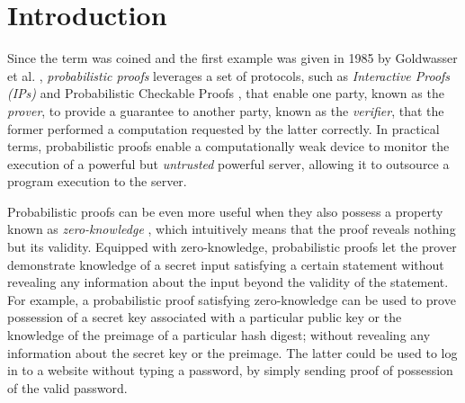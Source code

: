\section{Introduction}

Since the term was coined and the first example was given in 1985 by Goldwasser et al. \cite{STOC:GolMicRac85}, \textit{probabilistic proofs} leverages a set of protocols, such as \textit{Interactive Proofs (IPs)} \cite{STOC:GolMicRac85} and Probabilistic Checkable Proofs \cite{FOCS:AroSaf92}, that enable one party, known as the \textit{prover}, to provide a guarantee to another party, known as the \textit{verifier}, that the former performed a computation requested by the latter correctly. In practical terms, probabilistic proofs enable a computationally weak device to monitor the execution of a powerful but \textit{untrusted} powerful server, allowing it to outsource a program execution to the server.

Probabilistic proofs can be even more useful when they also possess a property known as \textit{zero-knowledge} \cite{STOC:GolMicRac85}, which intuitively means that the proof reveals nothing but its validity. Equipped with zero-knowledge, probabilistic proofs let the prover demonstrate knowledge of a secret input satisfying a certain statement without revealing any information about the input beyond the validity of the statement. For example, a probabilistic proof satisfying zero-knowledge can be used to prove possession of a secret key associated with a particular public key or the knowledge of the preimage of a particular hash digest; without revealing any information about the secret key or the preimage. The latter could be used to log in to a website without typing a password, by simply sending proof of possession of the valid password.

